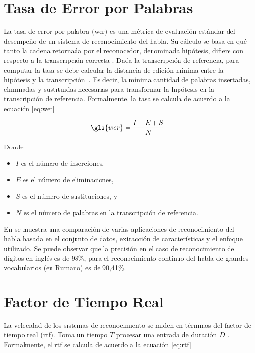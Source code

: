 \section{Tasa de Error por Palabras}
\label{sec:wer}

La tasa de error por palabra (\gls{wer}) es una m\'etrica de evaluaci\'on est\'andar del desempe\~no de un sistema de
reconocimiento del habla. Su c\'alculo se basa en qu\'e tanto la cadena retornada por el reconocedor,
denominada hip\'otesis, difiere con respecto a la transcripci\'on correcta \cite{Jurafsky}. 
Dada la transcripci\'on de referencia, para computar la tasa se debe calcular la distancia de edici\'on m\'inima
entre la hip\'otesis y la \mbox{transcripci\'on \cite{GaikwadAReview2010}}. Es decir, la m\'inima cantidad 
de palabras insertadas, eliminadas y sustituidas necesarias para transformar la hipótesis en la 
transcripción de referencia. Formalmente, la tasa se calcula de acuerdo a la ecuaci\'on \eqref{eq:wer}

\begin{equation}
\label{eq:wer}
    \gls{wer} = \frac{I + E + S}{N} 
\end{equation}

Donde

\begin{itemize}
    \item $I$ es el n\'umero de inserciones,
    \item $E$ es el n\'umero de eliminaciones,
    \item $S$ es el n\'umero de sustituciones, y
    \item $N$ es el n\'umero de palabras en la transcripci\'on de referencia.
\end{itemize}

En \cite{VimalaReview2012} se muestra una comparaci\'on de varias aplicaciones de reconocimiento del habla basada
en el conjunto de datos, extracci\'on de caracter\'isticas y el enfoque utilizado. Se puede observar que la precisi\'on
en el caso de reconocimiento de d\'igitos en ingl\'es es de 98\%, para el reconocimiento cont\'inuo del habla
de grandes vocabularios (en Rumano) es de 90,41\%.

\section{Factor de Tiempo Real}
\label{sec:rtf}

La velocidad de los sistemas de reconocimiento se miden en t\'erminos del factor de tiempo real (\gls{rtf}). 
Toma un tiempo $T$ procesar una entrada de duraci\'on $D$ \cite{VimalaReview2012}. 
Formalmente, el \gls{rtf} se calcula de acuerdo a la ecuaci\'on \eqref{eq:rtf}

